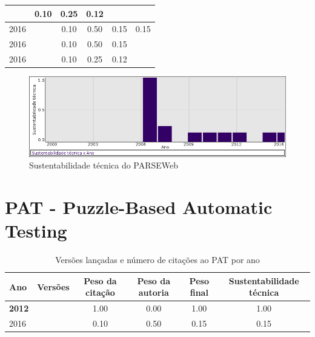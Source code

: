 \begin{table}[H]
\begin{tabular}{| l | c | c | c | c | c |}
          &
          0.10
          &
          0.25
          &
          0.12
          &
          \\
\hline
            2016
          &
          
          &
          0.10
          &
          0.50
          &
          0.15
          &
            {\color{red} 0.15}
          \\
            2016
          &
          
          &
          0.10
          &
          0.50
          &
          0.15
          &
          \\
            2016
          &
          
          &
          0.10
          &
          0.25
          &
          0.12
          &
          \\
\hline
\end{tabular}
\end{table}

\begin{figure}[h]
  \center
  \includegraphics[scale=0.50]{imagens/softwares-charts/parseweb.png}
  \caption{Sustentabilidade técnica do PARSEWeb}
\end{figure}


\section{PAT - Puzzle-Based Automatic Testing}


\begin{table}[H]
\caption{Versões lançadas e número de citações ao PAT por ano}
\centering
\begin{tabular}{| l | c | c | c | c | c |}
  \hline
  Ano & Versões & Peso da citação & Peso da autoria & Peso final & Sustentabilidade técnica \\
  \hline
            {\bf 2012}
          &
          
          &
          1.00
          &
          0.00
          &
          1.00
          &
            {\color{blue} 1.00}
          \\
\hline
            2016
          &
          
          &
          0.10
          &
          0.50
          &
          0.15
          &
            {\color{red} 0.15}
          \\
\hline
\end{tabular}
\end{table}

